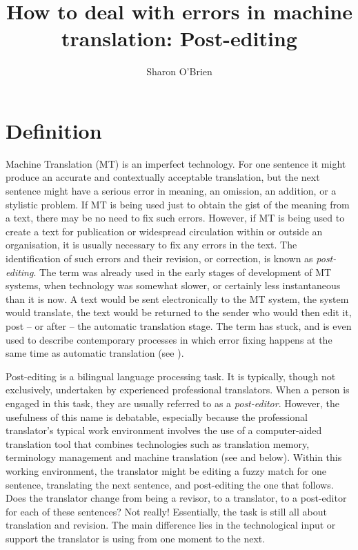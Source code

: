 \documentclass[output=paper,colorlinks,citecolor=brown]{langscibook}
\author{Sharon O’Brien\affiliation{Dublin City University}}
\title{How to deal with errors in machine translation: Post-editing}
\begin{document}
\maketitle


\section{Definition}

Machine Translation (MT) is an imperfect technology. For one sentence it might produce an accurate and contextually acceptable translation, but the next sentence might have a serious error in meaning, an omission, an addition, or a stylistic problem. If MT is being used just to obtain the gist of the meaning from a text, there may be no need to fix such errors. However, if MT is being used to create a text for publication or widespread circulation within or outside an organisation, it is usually necessary to fix any errors in the text. The identification of such errors and their revision, or correction, is known as \textit{post-editing}. The term was already used in the early stages of development of MT systems, when technology was somewhat slower, or certainly less instantaneous than it is now. A text would be sent electronically to the MT system, the system would translate, the text would be returned to the sender who would then edit it, post – or after – the automatic translation stage. The term has stuck, and is even used to describe contemporary processes in which error fixing happens at the same time as automatic translation (see ).

Post-editing is a bilingual language processing task. It is typically, though not exclusively, undertaken by experienced professional translators. When a person is engaged in this task, they are usually referred to as a \textit{post-editor}. However, the usefulness of this name is debatable, especially because the professional translator’s typical work environment involves the use of a computer-aided translation tool that combines technologies such as translation memory, terminology management and machine translation (see  and  below). Within this working environment, the translator might be editing a fuzzy match for one sentence, translating the next sentence, and post-editing the one that follows. Does the translator change from being a revisor, to a translator, to a post-editor for each of these sentences? Not really! Essentially, the task is still all about translation and revision. The main difference lies in the technological input or support the translator is using from one moment to the next.
\end{document}
